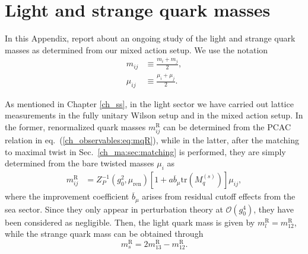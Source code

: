 
\chapter{Light and strange quark masses}
\label{apex_light_qm}

In this Appendix, report about an ongoing study of the light and strange quark masses as determined from our mixed action setup. We use the notation
\begin{align}
m_{ij}&\equiv\frac{m_i+m_j}{2}, \\
\mu_{ij}&\equiv\frac{\mu_i+\mu_j}{2}.
\end{align}

As mentioned in Chapter \ref{ch_ss}, in the light sector we have carried out lattice measurements in the fully unitary Wilson setup and in the mixed action setup. In the former, renormalized quark masses $m_{ij}^{\textrm{R}}$ can be determined from the PCAC relation in eq.~(\ref{ch_observables:eq:mqR}), while in the latter, after the matching to maximal twist in Sec.~\ref{ch_ma:sec:matching} is performed, they are simply determined from the bare twisted masses $\mu_i$ as
\begin{align}
m_{ij}^{\textrm{R}}&=Z_P^{-1}(g_0^2,\mu_{\textrm{ren}})\left[1+a\overline{b}_\mu\textrm{tr}\left(M_q^{(s)}\right)\right]\mu_{ij},
\end{align}
where the improvement coefficient $\overline{b}_{\mu}$ arises from residual cutoff effects from the sea sector. Since they only  appear in perturbation theory at $\mathcal{O}(g_0^4)$, they have been considered as negligible. Then, the light quark mass is given by $m_{l}^{\textrm{R}}=m_{12}^{\textrm{R}}$, while the strange quark mass can be obtained through
\begin{equation}
m_s^{\textrm{R}}=2m_{13}^{\textrm{R}}-m_{12}^{\textrm{R}}.
\end{equation}

